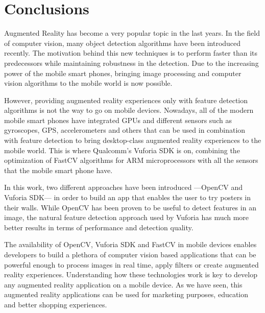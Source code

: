 \chapter{Conclusions}
Augmented Reality has become a very popular topic in the last years. In the field of
computer vision, many object detection algorithms have been introduced recently. The
motivation behind this new techniques is to perform faster than its predecessors
while maintaining robustness in the detection. Due to the increasing power of the
mobile smart phones, bringing image processing and computer vision algorithms to the
mobile world is now possible.

However, providing augmented reality experiences only with feature detection
algorithms is not the way to go on mobile devices. Nowadays, all of the modern
mobile smart phones have integrated GPUs and different sensors such as gyroscopes,
GPS, accelerometers and others that can be used in combination with feature
detection to bring desktop-class augmented reality experiences to the mobile world. 
This is where Qualcomm's Vuforia SDK is on, combining the optimization of
FastCV algorithms for ARM microprocessors with all the sensors that the mobile
smart phone have. 

In this work, two different approaches have been introduced ---OpenCV and
Vuforia SDK--- in order to build an app that enables the user to try posters in
their walls. While OpenCV has been proven to be useful to detect features in an
image, the natural feature detection approach used by Vuforia has much more
better results in terms of performance and detection quality. 

The availability of OpenCV, Vuforia SDK and FastCV in mobile devices enables
developers to build a plethora of computer vision based applications that can be
powerful enough to process images in real time, apply filters or create augmented
reality experiences. Understanding how these technologies work is key to develop any
augmented reality application on a mobile device. As we have seen, this augmented
reality applications can be used for marketing purposes, education and better
shopping experiences.



